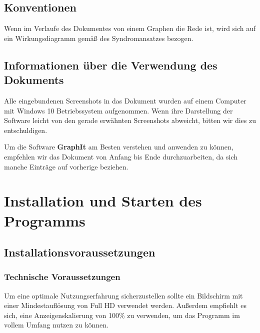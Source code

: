 \documentclass[enabledeprecatedfontcommands,fontsize=11pt,paper=a4,twoside]{scrartcl}
\newcounter{one}
\newcounter{two}[one]
\let\tempone\itemize
\let\temptwo\enditemize
\renewenvironment{itemize}{\tempone\addtolength{\itemsep}{-10.0pt}}{\temptwo}
\begin{document}
\subsection{Konventionen}
\begin{itemize}
	\item Wenn im Verlaufe des Dokumentes von einem Graphen die Rede ist, wird sich auf ein Wirkungsdiagramm  gemäß des Syndromansatzes bezogen.
\end{itemize}

\subsection{Informationen über die Verwendung des Dokuments}

\begin{itemize}
	\item Alle eingebundenen Screenshots in das Dokument wurden auf einem Computer mit Windows 10 Betriebssystem aufgenommen. Wenn ihre Darstellung der Software leicht von den gerade erwähnten Screenshots abweicht, bitten wir dies zu entschuldigen.
	\item Um die Software \textbf{GraphIt} am Besten verstehen und anwenden zu können, empfehlen wir das Dokument von Anfang bis Ende durchzuarbeiten, da sich manche Einträge auf vorherige beziehen. 
\end{itemize}



\newpage
\section{Installation und Starten des Programms} \label{sec:installation}


\subsection{Installationsvoraussetzungen}
\subsubsection{Technische Voraussetzungen}
Um eine optimale Nutzungserfahrung sicherzustellen sollte ein Bildschirm mit einer Mindestauflösung von Full HD verwendet werden. Außerdem empfiehlt es sich, eine Anzeigenskalierung von 100\% zu verwenden, um das Programm im vollem Umfang nutzen zu können.
\end{document}
